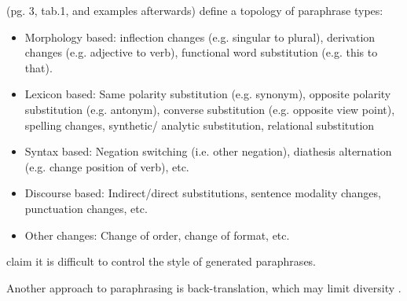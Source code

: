 \citet{zhou_paraphrase_2025} (pg. 3, tab.1, and examples afterwards) define a topology of paraphrase types:
\begin{itemize}
    \item Morphology based: inflection changes (e.g. singular to plural), derivation changes (e.g. adjective to verb), functional word substitution (e.g. this to that).
    \item Lexicon based: Same polarity substitution (e.g. synonym), opposite polarity substitution (e.g. antonym), converse substitution (e.g. opposite view point), spelling changes, synthetic/ analytic substitution, relational substitution
    \item Syntax based: Negation switching (i.e. other negation), diathesis alternation (e.g. change position of verb), etc.
    \item Discourse based: Indirect/direct substitutions, sentence modality changes, punctuation changes, etc.
    \item Other changes: Change of order, change of format, etc.
\end{itemize}

\citet{zhou_paraphrase_2021} claim it is difficult to control the style of generated paraphrases.

Another approach to paraphrasing is back-translation, which may limit diversity \citep{zhou_paraphrase_2025}.
